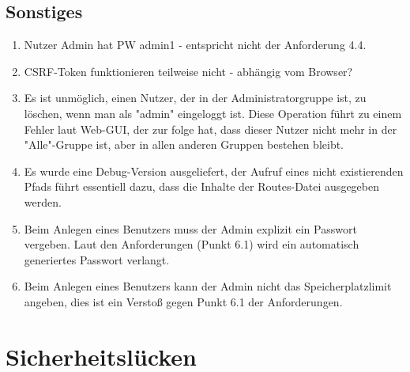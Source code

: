 \documentclass[12pt,DIV14,BCOR10mm,a4paper,parskip=half-,headsepline,headinclude,english,ngerman,bibliography=totocnumbered]{scrreprt}
\begin{document}
\section{Sonstiges}

\begin{enumerate}[resume]

  \item Nutzer Admin hat PW admin1 - entspricht nicht der Anforderung 4.4.
  \item CSRF-Token funktionieren teilweise nicht - abhängig vom Browser?
  \item Es ist unmöglich, einen Nutzer, der in der Administratorgruppe ist, zu löschen, wenn man als "admin" eingeloggt ist. Diese Operation führt zu einem Fehler laut Web-GUI, der zur folge hat, dass dieser Nutzer nicht mehr in der "Alle"-Gruppe ist, aber in allen anderen Gruppen bestehen bleibt.
  \item Es wurde eine Debug-Version ausgeliefert, der Aufruf eines nicht existierenden Pfads führt essentiell dazu, dass die Inhalte der Routes-Datei ausgegeben werden.
  \item Beim Anlegen eines Benutzers muss der Admin explizit ein Passwort vergeben. Laut den Anforderungen (Punkt 6.1) wird ein automatisch generiertes Passwort verlangt.
\item Beim Anlegen eines Benutzers kann der Admin nicht das Speicherplatzlimit angeben, dies ist ein Verstoß gegen Punkt 6.1 der Anforderungen.
\end{enumerate}

\chapter{Sicherheitslücken}
\end{document}
